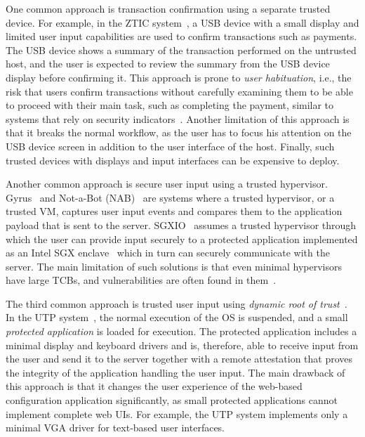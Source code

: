  One common approach is transaction confirmation using a separate trusted device. For example, in the ZTIC system~\cite{weigold2011}, a USB device with a small display and limited user input capabilities are used to confirm transactions such as payments. The USB device shows a summary of the transaction performed on the untrusted host, and the user is expected to review the summary from the USB device display before confirming it. This approach is prone to \emph{user habituation}, i.e., the risk that users confirm transactions without carefully examining them to be able to proceed with their main task, such as completing the payment, similar to systems that rely on security indicators~\cite{schechter2007emperor,197283,41927}. Another limitation of this approach is that it breaks the normal workflow, as the user has to focus his attention on the USB device screen in addition to the user interface of the host. Finally, such trusted devices with displays and input interfaces can be expensive to deploy. 

 Another common approach is secure user input using a trusted hypervisor. Gyrus~\cite{gyrus} and Not-a-Bot (NAB)~\cite{nab} are systems where a trusted hypervisor, or a trusted VM, captures user input events and compares them to the application payload that is sent to the server. SGXIO~\cite{sgxio} assumes a trusted hypervisor through which the user can provide input securely to a protected application implemented as an Intel SGX enclave~\cite{sgx} which in turn can securely communicate with the server. The main limitation of such solutions is that even minimal hypervisors have large TCBs, and vulnerabilities are often found in them~\cite{hashizume2013analysis,perez2013characterizing}.

 The third common approach is trusted user input using \emph{dynamic root of trust}~\cite{mccune2008flicker}. In the UTP system~\cite{utp}, the normal execution of the OS is suspended, and a small \emph{protected application} is loaded for execution. The protected application includes a minimal display and keyboard drivers and is, therefore, able to receive input from the user and send it to the server together with a remote attestation that proves the integrity of the application handling the user input. The main drawback of this approach is that it changes the user experience of the web-based configuration application significantly, as small protected applications cannot implement complete web UIs. For example, the UTP system implements only a minimal VGA driver for text-based user interfaces.



